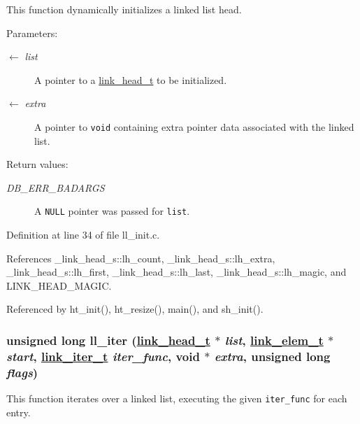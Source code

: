 This function dynamically initializes a linked list head.

\begin{Desc}
\item[Parameters:]
\begin{description}
\item[\mbox{$\leftarrow$} {\em list}]A pointer to a \hyperlink{group__dbprim__link_ga0}{link\_\-head\_\-t} to be initialized. \item[\mbox{$\leftarrow$} {\em extra}]A pointer to {\tt void} containing extra pointer data associated with the linked list.\end{description}
\end{Desc}
\begin{Desc}
\item[Return values:]
\begin{description}
\item[{\em DB\_\-ERR\_\-BADARGS}]A {\tt NULL} pointer was passed for {\tt list}.\end{description}
\end{Desc}


Definition at line 34 of file ll\_\-init.c.

References \_\-link\_\-head\_\-s::lh\_\-count, \_\-link\_\-head\_\-s::lh\_\-extra, \_\-link\_\-head\_\-s::lh\_\-first, \_\-link\_\-head\_\-s::lh\_\-last, \_\-link\_\-head\_\-s::lh\_\-magic, and LINK\_\-HEAD\_\-MAGIC.

Referenced by ht\_\-init(), ht\_\-resize(), main(), and sh\_\-init().\hypertarget{group__dbprim__link_ga10}{
\subsubsection[ll\_\-iter]{\setlength{\rightskip}{0pt plus 5cm}unsigned long ll\_\-iter (\hyperlink{struct__link__head__s}{link\_\-head\_\-t} $\ast$ {\em list}, \hyperlink{struct__link__elem__s}{link\_\-elem\_\-t} $\ast$ {\em start}, \hyperlink{group__dbprim__link_ga2}{link\_\-iter\_\-t} {\em iter\_\-func}, void $\ast$ {\em extra}, unsigned long {\em flags})}}
\label{group__dbprim__link_ga10}


This function iterates over a linked list, executing the given {\tt iter\_\-func} for each entry.

